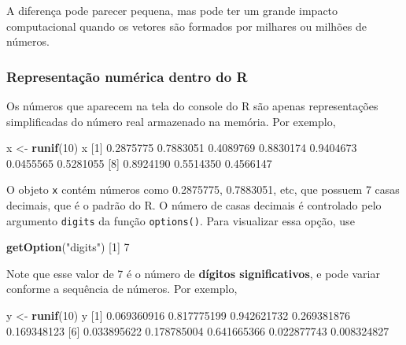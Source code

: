 \documentclass[10pt,a4paper]{book}
\newenvironment{Shaded}{\begin{snugshade}}{\end{snugshade}}
\newcommand{\KeywordTok}[1]{\textcolor[rgb]{0.13,0.29,0.53}{\textbf{#1}}}
\newcommand{\DecValTok}[1]{\textcolor[rgb]{0.00,0.00,0.81}{#1}}
\newcommand{\FloatTok}[1]{\textcolor[rgb]{0.00,0.00,0.81}{#1}}
\newcommand{\StringTok}[1]{\textcolor[rgb]{0.31,0.60,0.02}{#1}}
\newcommand{\NormalTok}[1]{#1}
\begin{document}
A diferença pode parecer pequena, mas pode ter um grande impacto
computacional quando os vetores são formados por milhares ou milhões de
números.

\subsubsection{Representação numérica dentro do
R}\label{representacao-numerica-dentro-do-r}

Os números que aparecem na tela do console do R são apenas
representações simplificadas do número real armazenado na memória. Por
exemplo,

\begin{Shaded}
\begin{Highlighting}[]
\NormalTok{x <-}\StringTok{ }\KeywordTok{runif}\NormalTok{(}\DecValTok{10}\NormalTok{)}
\NormalTok{x}
\NormalTok{ [}\DecValTok{1}\NormalTok{] }\FloatTok{0.2875775} \FloatTok{0.7883051} \FloatTok{0.4089769} \FloatTok{0.8830174} \FloatTok{0.9404673} \FloatTok{0.0455565} \FloatTok{0.5281055}
\NormalTok{ [}\DecValTok{8}\NormalTok{] }\FloatTok{0.8924190} \FloatTok{0.5514350} \FloatTok{0.4566147}
\end{Highlighting}
\end{Shaded}

O objeto \texttt{x} contém números como 0.2875775, 0.7883051, etc, que
possuem 7 casas decimais, que é o padrão do R. O número de casas
decimais é controlado pelo argumento \texttt{digits} da função
\texttt{options()}. Para visualizar essa opção, use

\begin{Shaded}
\begin{Highlighting}[]
\KeywordTok{getOption}\NormalTok{(}\StringTok{"digits"}\NormalTok{)}
\NormalTok{[}\DecValTok{1}\NormalTok{] }\DecValTok{7}
\end{Highlighting}
\end{Shaded}

Note que esse valor de 7 é o número de \textbf{dígitos significativos},
e pode variar conforme a sequência de números. Por exemplo,

\begin{Shaded}
\begin{Highlighting}[]
\NormalTok{y <-}\StringTok{ }\KeywordTok{runif}\NormalTok{(}\DecValTok{10}\NormalTok{)}
\NormalTok{y}
\NormalTok{ [}\DecValTok{1}\NormalTok{] }\FloatTok{0.069360916} \FloatTok{0.817775199} \FloatTok{0.942621732} \FloatTok{0.269381876} \FloatTok{0.169348123}
\NormalTok{ [}\DecValTok{6}\NormalTok{] }\FloatTok{0.033895622} \FloatTok{0.178785004} \FloatTok{0.641665366} \FloatTok{0.022877743} \FloatTok{0.008324827}
\end{Highlighting}
\end{Shaded}
\end{document}
